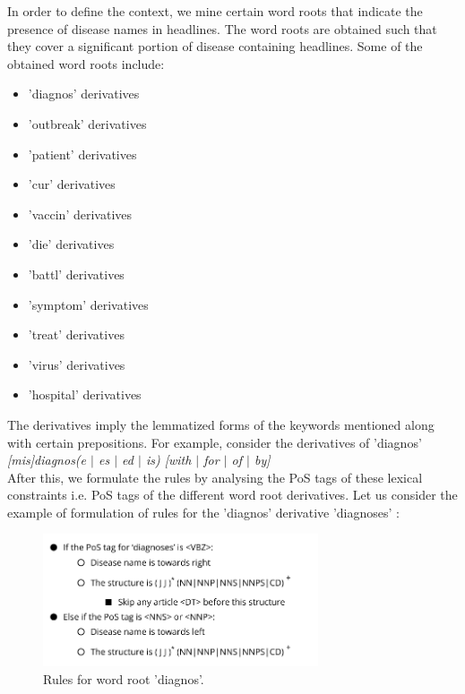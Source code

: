 \documentclass{article}
\begin{document}
In order to define the context, we mine certain word roots that indicate the presence of disease names in headlines. The word roots are obtained such that they cover a significant portion of disease containing headlines. Some of the obtained word roots include: 

\begin{itemize}
\item 'diagnos' derivatives

\item 'outbreak' derivatives

\item 'patient' derivatives

\item 'cur' derivatives

\item 'vaccin' derivatives

\item 'die' derivatives

\item 'battl' derivatives

\item 'symptom' derivatives

\item 'treat' derivatives

\item 'virus' derivatives

\item 'hospital' derivatives

\end{itemize}
The derivatives imply the lemmatized forms of the keywords mentioned along with
certain prepositions. For example, consider the derivatives of 'diagnos'\\

\textit{[mis]diagnos(e  $|$ es $|$ ed $|$ is) [with $|$ for $|$ of  $|$ by]}\\ 

After this, we formulate the rules by analysing the PoS tags of these lexical constraints i.e. PoS tags of the
different word root derivatives. Let us consider the example of formulation of rules for the
'diagnos' derivative 'diagnoses' :


\begin{figure}[h]
\centering
\includegraphics[width=3.2in]{img/rules.png}
\caption{Rules for word root 'diagnos'.}
\label{fig:rules}
\end{figure}
\end{document}
